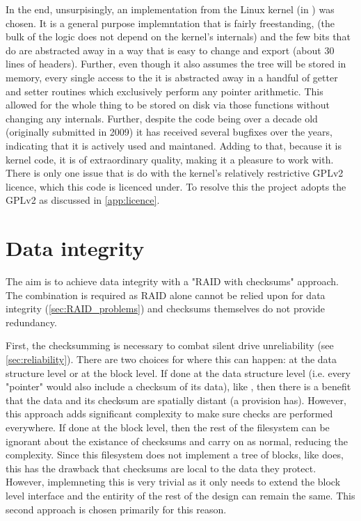         In the end, unsurpisingly, an implementation from the Linux kernel (in
         \cite{Linux_source}) was chosen. It is a
        general purpose \bplustree implemntation that is fairly freestanding,
        (the bulk of the logic does not depend on the kernel's internals) and
        the few bits that do are abstracted away in a way that is easy to
        change and export (about 30 lines of headers). Further, even though it
        also assumes the tree will be stored in memory, every single access to
        the it is abstracted away in a handful of getter and setter routines
        which exclusively perform any pointer arithmetic. This allowed for the
        whole thing to be stored on disk via those functions without changing
        any internals. Further, despite the code being over a decade old
        (originally submitted in 2009) it has received several bugfixes over
        the years, indicating that it is actively used and maintaned. Adding to
        that, because it is kernel code, it is of extraordinary quality, making
        it a pleasure to work with. There is only one issue that is do with the
        kernel's relatively restrictive GPLv2 licence, which this code is
        licenced under. To resolve this the project adopts the GPLv2 as
        discussed in \autoref{app:licence}.

    \section{Data integrity}
        \label{sec:data_integrity}

        The aim is to achieve data integrity with a "RAID with checksums"
        approach. The combination is required as RAID alone cannot be relied
        upon for data integrity (\autoref{sec:RAID_problems}) and checksums
        themselves do not provide redundancy.

        First, the checksumming is necessary to combat silent drive
        unreliability (see \autoref{sec:reliability}). There are two choices for
        where this can happen: at the data structure level or at the block
        level. If done at the data structure level (i.e. every "pointer" would
        also include a checksum of its data), like , then
        there is a benefit that the data and its checksum are spatially distant
        (a provision  has). However, this approach adds
        significant complexity to make sure checks are performed everywhere. If
        done at the block level, then the rest of the filesystem can be
        ignorant about the existance of checksums and carry on as normal,
        reducing the complexity. Since this filesystem does not implement a
        tree of blocks, like  does, this has the drawback
        that checksums are local to the data they protect. However,
        implemneting this is very trivial as it only needs to extend the block
        level interface and the entirity of the rest of the design can remain
        the same. This second approach is chosen primarily for this reason.

